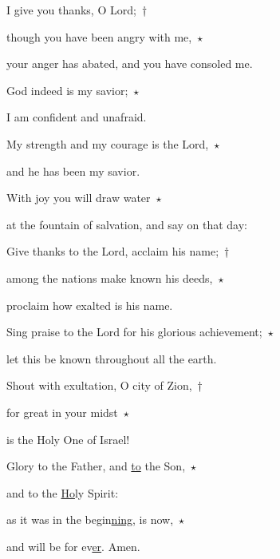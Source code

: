 \noindent I give you thanks, O Lord;~†~\nopagebreak

though you have been angry with me,~$\star$~\nopagebreak

your anger has abated, and you have consoled me.

\noindent God indeed is my savior;~$\star$~\nopagebreak

I am confident and unafraid.

\noindent My strength and my courage is the Lord,~$\star$~\nopagebreak

and he has been my savior.

\noindent With joy you will draw water~$\star$~\nopagebreak

at the fountain of salvation, and say on that day:

\noindent Give thanks to the Lord, acclaim his name;~†~\nopagebreak

among the nations make known his deeds,~$\star$~\nopagebreak

proclaim how exalted is his name.

\noindent Sing praise to the Lord for his glorious achievement;~$\star$~\nopagebreak

let this be known throughout all the earth.

\noindent Shout with exultation, O city of Zion,~†~\nopagebreak

for great in your midst~$\star$~\nopagebreak

is the Holy One of Israel!

\noindent Glory to the Father, and \uline{to} the Son,~$\star$~\nopagebreak

and to the \uline{Ho}ly Spirit:

\noindent as it was in the begin\uline{ning}, is now,~$\star$~\nopagebreak

and will be for ev\uline{er}. Amen.